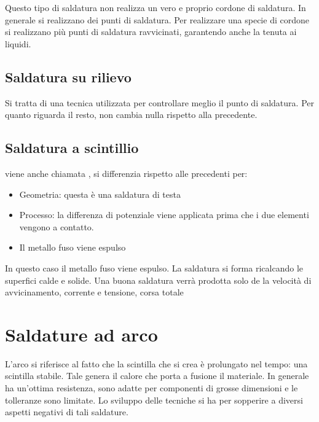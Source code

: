 Questo tipo di saldatura non realizza un vero e proprio cordone di saldatura. In generale si realizzano dei punti di saldatura.
Per realizzare una specie di cordone si realizzano più punti di saldatura ravvicinati, garantendo anche la tenuta ai liquidi.

\subsection{Saldatura su rilievo}
Si tratta di una tecnica utilizzata per controllare meglio il punto di saldatura. Per quanto riguarda il resto, non cambia nulla rispetto alla precedente.


\subsection{Saldatura a scintillio}
viene anche chiamata , si differenzia rispetto alle precedenti per:
\begin{itemize}
\item Geometria: questa è una saldatura di testa
\item Processo: la differenza di potenziale viene applicata prima che i due elementi vengono a contatto.
\item Il metallo fuso viene espulso
\end{itemize}

In questo caso il metallo fuso viene espulso.
La saldatura si forma ricalcando le superfici calde e solide.
Una buona saldatura verrà prodotta solo de la velocità di avvicinamento, corrente e tensione, corsa totale \todo{\\Completa}

\section{Saldature ad arco}
L'arco si riferisce al fatto che la scintilla che si crea è prolungato nel tempo: una scintilla stabile.
Tale genera il calore che porta a fusione il materiale.
In generale ha un'ottima resistenza, sono adatte per componenti di grosse dimensioni e le tolleranze sono limitate.
Lo sviluppo delle tecniche si ha per sopperire a diversi aspetti negativi di tali saldature.

